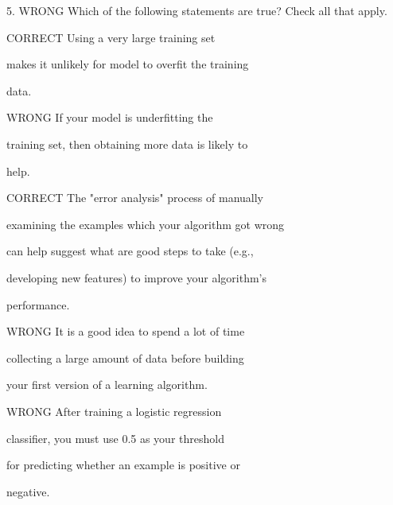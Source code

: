 \documentclass[11pt]{article} %
\begin{document}

5. WRONG
Which of the following statements are true? Check all that apply.


CORRECT Using a very large training set

makes it unlikely for model to overfit the training

data.


WRONG If your model is underfitting the

training set, then obtaining more data is likely to

help.

CORRECT The "error analysis" process of manually

examining the examples which your algorithm got wrong

can help suggest what are good steps to take (e.g.,

developing new features) to improve your algorithm's

performance.



WRONG It is a good idea to spend a lot of time

collecting a large amount of data before building

your first version of a learning algorithm.



WRONG After training a logistic regression

classifier, you must use 0.5 as your threshold

for predicting whether an example is positive or

negative.
\end{document}
